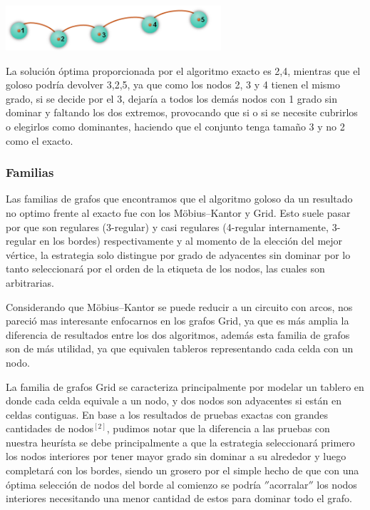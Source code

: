 \begin {center}
\includegraphics[width=8cm]{./graficos/grafo_camino.png}
\end {center} 
La solución óptima proporcionada por el algoritmo exacto es {2,4}, mientras que el goloso podría devolver {3,2,5}, ya que como los nodos 2, 3 y 4 tienen el mismo grado, si se decide por el 3, dejaría a todos los demás nodos con 1 grado sin dominar y faltando los dos extremos, provocando que si o si se necesite cubrirlos o elegirlos como dominantes, haciendo que el conjunto tenga tamaño 3 y no 2 como el exacto.

\subsubsection {Familias}
Las familias de grafos que encontramos que el algoritmo goloso da un resultado no optimo frente al exacto fue con los Möbius–Kantor y Grid. Esto suele pasar por que son regulares (3-regular) y casi regulares (4-regular internamente, 3-regular en los bordes) respectivamente y al momento de la elección del mejor vértice, la estrategia solo distingue por grado de adyacentes sin dominar por lo tanto seleccionará por el orden de la etiqueta de los nodos, las cuales son arbitrarias. 

Considerando que Möbius–Kantor se puede reducir a un circuito con arcos, nos pareció mas interesante enfocarnos en los grafos Grid, ya que es más amplia la diferencia de resultados entre los dos algoritmos, además esta familia de grafos son de más utilidad, ya que equivalen tableros representando cada celda con un nodo.

La familia de grafos Grid se caracteriza principalmente por modelar un tablero en donde cada celda equivale a un nodo, y dos nodos son adyacentes si están en celdas contiguas. En base a los resultados de pruebas exactas con grandes cantidades de nodos$^{[2]}$, pudimos notar que la diferencia a las pruebas con nuestra heurísta se debe principalmente a que la estrategia seleccionará primero los nodos interiores por tener mayor grado sin dominar a su alrededor y luego completará con los bordes, siendo un grosero por el simple hecho de que con una óptima selección de nodos del borde al comienzo se podría $''$acorralar$''$ los nodos interiores necesitando una menor cantidad de estos para dominar todo el grafo. 

